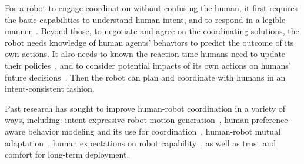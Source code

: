 \documentclass[letterpaper, 10 pt, conference]{ieeeconf}  %
\begin{document}
For a robot to engage coordination without confusing the human, it first 
requires the basic capabilities to understand human intent, and to respond in a 
legible manner~\cite{dragan2013legibility}. Beyond those, to negotiate and agree on the coordinating 
solutions, the robot needs knowledge of human agents' behaviors to 
predict the outcome of its own actions. 
It also needs to known the reaction time humans need 
to update their policies~\cite{shah2011improved}, and to consider potential 
impacts of its own actions on humans' future 
decisions~\cite{fujiwara2015non,foerster2017learning}. Then the 
robot can plan and coordinate with humans in an intent-consistent fashion. 

Past research has sought to improve human-robot coordination in a variety of 
ways, including: intent-expressive robot 
motion generation~\cite{dragan2013legibility,lichtenthaler2012influence}, human 
preference-aware behavior modeling and its 
use for coordination~\cite{gombolay2015coordination,dorsa2017active}, human-robot mutual 
adaptation~\cite{nikolaidis2013human,nikolaidis2016formalizing}, human 
expectations on robot capability~\cite{cha2015perceived,kwon2016human}, as well as trust and comfort for long-term 
deployment\cite{yang2017evaluating}. 
\end{document}
